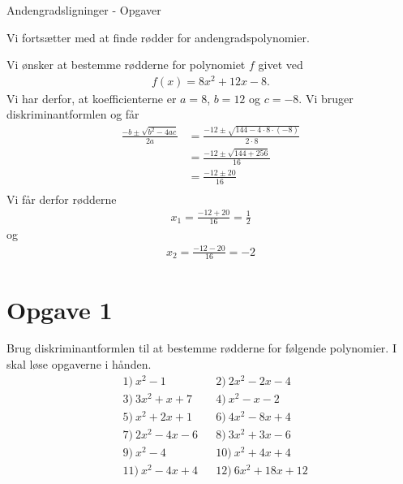 \documentclass[12pt]{article}
\begin{document}


\begin{center}
\Huge
Andengradsligninger - Opgaver
\end{center}

Vi fortsætter med at finde rødder for andengradspolynomier.

\begin{exa}
Vi ønsker at bestemme rødderne for polynomiet $f$ givet ved
\begin{align*}
f(x) = 8x^2+12x-8.
\end{align*}
Vi har derfor, at koefficienterne er $a = 8$, $b = 12$ og $c= -8$. Vi bruger diskriminantformlen og får
\begin{align*}
\frac{-b\pm \sqrt{b^2-4ac}}{2a} &= \frac{-12 \pm \sqrt{144-4\cdot 8 \cdot (-8)}}{2\cdot 8}\\
&= \frac{-12 \pm \sqrt{144+256}}{16}\\
&= \frac{-12\pm 20}{16}\\
\end{align*}
Vi får derfor rødderne 
\begin{align*}
x_1 =\frac{-12+20}{16} = \frac{1}{2} 
\end{align*}
og 
\begin{align*}
	x_2 = \frac{-12-20}{16} = -2
\end{align*}
\end{exa}



\section*{Opgave 1}
Brug diskriminantformlen til at bestemme rødderne for følgende polynomier. I skal løse opgaverne i hånden. 
\begin{align*}
&1) \ x^2-1   &&2) \ 2x^2-2x-4    \\
&3) \  3x^2+x+7   &&4) \ x^2-x-2   \\
&5) \  x^2+2x+1  &&6) \  4x^2-8x+4  \\
&7) \ 2x^2-4x-6   &&8) \ 3x^2+3x-6   \\
&9) \ x^2-4   &&10) \ x^2+4x+4   \\
&11) \  x^2-4x+4  &&12) \ 6x^2+18x+12   
\end{align*}
\end{document}
